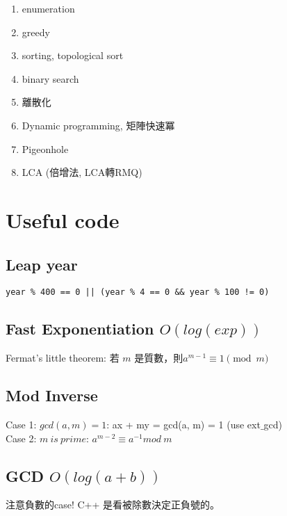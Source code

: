 \documentclass[10pt,oneside]{article}
\begin{document}
\begin{landscape}
\begin{multicols}{2}
\begin{enumerate}
	\item enumeration
	\item greedy 
	\item sorting, topological sort
	\item binary search
	\item 離散化
	\item Dynamic programming, 矩陣快速冪
	\item Pigeonhole 
	\item LCA (倍增法, LCA轉RMQ)
\end{enumerate}


\section{Useful code}

\subsection{Leap year}

\begin{lstlisting}
year % 400 == 0 || (year % 4 == 0 && year % 100 != 0)
\end{lstlisting}

\subsection{Fast Exponentiation $O(log(exp))$}

Fermat's little theorem: 若 $m$ 是質數，則$a^{m-1} \equiv 1 \pmod m$



\subsection{Mod Inverse}

Case 1: $gcd(a, m) = 1$:  ax + my = gcd(a, m) = 1 (use ext$\_$gcd) \\

\noindent Case 2: $m\ is\ prime$: $a^{m - 2} \equiv a^{-1} mod\ m$ 

\subsection{GCD $O(log(a + b))$}

注意負數的case! C++ 是看被除數決定正負號的。


\end{multicols}
\end{landscape}
\end{document}
